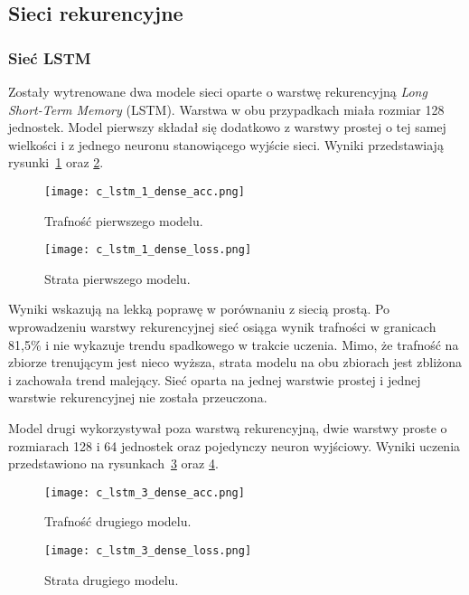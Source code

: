 \subsection{Sieci rekurencyjne}
\subsubsection{Sieć LSTM}

Zostały wytrenowane dwa modele sieci oparte o warstwę rekurencyjną \emph{Long Short-Term Memory} (LSTM). Warstwa w obu przypadkach miała rozmiar 128 jednostek. Model pierwszy składał się dodatkowo z warstwy prostej o tej samej wielkości i z jednego neuronu stanowiącego wyjście sieci. Wyniki przedstawiają rysunki~\ref{c_lstm_1_acc} oraz \ref{c_lstm_1_loss}.

\begin{figure}[H]
\centering
\texttt{[image: c\_lstm\_1\_dense\_acc.png]}
\caption{Trafność pierwszego modelu.}
\label{c_lstm_1_acc}
\end{figure}

\begin{figure}[H]
\centering
\texttt{[image: c\_lstm\_1\_dense\_loss.png]}
\caption{Strata pierwszego modelu.}
\label{c_lstm_1_loss}
\end{figure}

Wyniki wskazują na lekką poprawę w porównaniu z siecią prostą. Po wprowadzeniu warstwy rekurencyjnej sieć osiąga wynik trafności w granicach 81,5\% i nie wykazuje trendu spadkowego w trakcie uczenia. Mimo, że trafność na zbiorze trenującym jest nieco wyższa, strata modelu na obu zbiorach jest zbliżona i zachowała trend malejący. Sieć oparta na jednej warstwie prostej i jednej warstwie rekurencyjnej nie została przeuczona.

Model drugi wykorzystywał poza warstwą rekurencyjną, dwie warstwy proste o rozmiarach 128 i 64 jednostek oraz pojedynczy neuron wyjściowy. Wyniki uczenia przedstawiono na rysunkach~\ref{c_lstm_2_acc} oraz \ref{c_lstm_2_loss}.

\begin{figure}[H]
\centering
\texttt{[image: c\_lstm\_3\_dense\_acc.png]}
\caption{Trafność drugiego modelu.}
\label{c_lstm_2_acc}
\end{figure}

\begin{figure}[H]
\centering
\texttt{[image: c\_lstm\_3\_dense\_loss.png]}
\caption{Strata drugiego modelu.}
\label{c_lstm_2_loss}
\end{figure}

